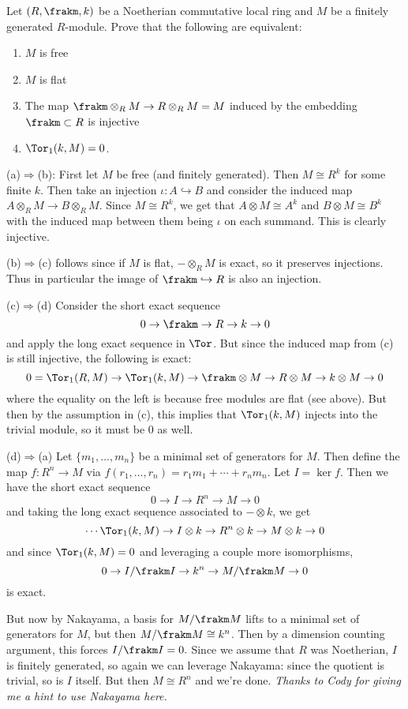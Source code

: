 \documentclass[12pt]{article}
\begin{document}
\begin{prob}
	Let $(R, \frakm, k)$ be a Noetherian commutative local ring and $M$ be a finitely generated $R$-module. Prove that the following are equivalent: 
	\begin{enumerate}
		\item $M$ is free
		\item $M$ is flat
		\item The map $\frakm \otimes_R M \to R \otimes_R M =M$ induced by the embedding $\frakm \subset R$ is injective
		\item $\Tor_1(k,M)=0$.
	\end{enumerate}
\end{prob}
\begin{sol}
	(a)$\Rightarrow$(b): First let $M$ be free (and finitely generated). Then $M\cong R^k$ for some finite $k$. 
	Then take an injection $\iota:A\hookrightarrow B$ and consider the induced map $A\otimes_R M\to B\otimes_R M$. Since $M\cong R^k$, we get 
	that $A\otimes M\cong A^k$ and $B\otimes M\cong B^k$ with the induced map between them being $\iota$ on each summand. This is clearly injective.

	(b)$\Rightarrow$(c) follows since if $M$ is flat, $-\otimes_RM$ is exact, so it preserves injections. Thus in particular 
	the image of $\frakm\hookrightarrow R$ is also an injection. 

	(c)$\Rightarrow$(d) Consider the short exact sequence 
	\[0\to\frakm\to R\to k\to 0\]
	and apply the long exact sequence in $\Tor$. But since the induced map from (c) is still injective, the following is exact:
	\[0=\Tor_1(R,M)\to \Tor_1(k,M)\to \frakm\otimes M\to R\otimes M\to k\otimes M\to 0\]
	where the equality on the left is because free modules are flat (see above).
	But then by the assumption in (c), this implies that $\Tor_1(k,M)$ injects into the trivial module, so it must be 0 as well.

	(d)$\Rightarrow$(a) Let $\{m_1,\dots,m_n\}$ be a minimal set of generators for $M$. Then define the map $f:R^n\to M$ via 
	$f(r_1,\dots,r_n)=r_1m_1+\cdots+r_nm_n.$ Let $I=\ker f$. Then we have the short exact sequence 
	\[0\to I\to R^n\to M\to 0\]
	and taking the long exact sequence associated to $-\otimes k$, we get 
	\[\cdots \Tor_1(k,M)\to I\otimes k\to R^n\otimes k\to M\otimes k\to 0\]
	and since $\Tor_1(k,M)=0$ and leveraging a couple more isomorphisms,
	\[0\to I/\frakm I\to k^n\to M/\frakm M\to 0\]
	is exact.

	But now by Nakayama, a basis for $M/\frakm M$ lifts to a minimal set of generators for $M$, but then $M/\frakm M\cong k^n$. Then by a dimension counting 
	argument, this forces $I/\frakm I=0.$ Since we assume that $R$ was Noetherian, $I$ is finitely generated, so again we can leverage Nakayama: since the quotient is 
	trivial, so is $I$ itself. But then $M\cong R^n$ and we're done. \textit{Thanks to Cody for giving me a hint to use Nakayama here.}
\end{sol}
\end{document}
